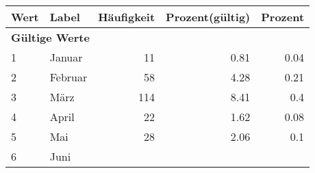      \begin{longtable}{lXrrr}
     \toprule
     \textbf{Wert} & \textbf{Label} & \textbf{Häufigkeit} & \textbf{Prozent(gültig)} & \textbf{Prozent} \\
     \endhead
     \midrule
     \multicolumn{5}{l}{\textbf{Gültige Werte}}\\

     1 &
     \multicolumn{1}{X}{ Januar   } &


       \num{11} &
       \num[round-mode=places,round-precision=2]{0,81} &
         \num[round-mode=places,round-precision=2]{0,04} \\

     2 &
     \multicolumn{1}{X}{ Februar   } &


       \num{58} &
       \num[round-mode=places,round-precision=2]{4,28} &
         \num[round-mode=places,round-precision=2]{0,21} \\

     3 &
     \multicolumn{1}{X}{ März   } &


       \num{114} &
       \num[round-mode=places,round-precision=2]{8,41} &
         \num[round-mode=places,round-precision=2]{0,4} \\

     4 &
     \multicolumn{1}{X}{ April   } &


       \num{22} &
       \num[round-mode=places,round-precision=2]{1,62} &
         \num[round-mode=places,round-precision=2]{0,08} \\

     5 &
     \multicolumn{1}{X}{ Mai   } &


       \num{28} &
       \num[round-mode=places,round-precision=2]{2,06} &
         \num[round-mode=places,round-precision=2]{0,1} \\

     6 &
     \multicolumn{1}{X}{ Juni   } &



\end{longtable}
